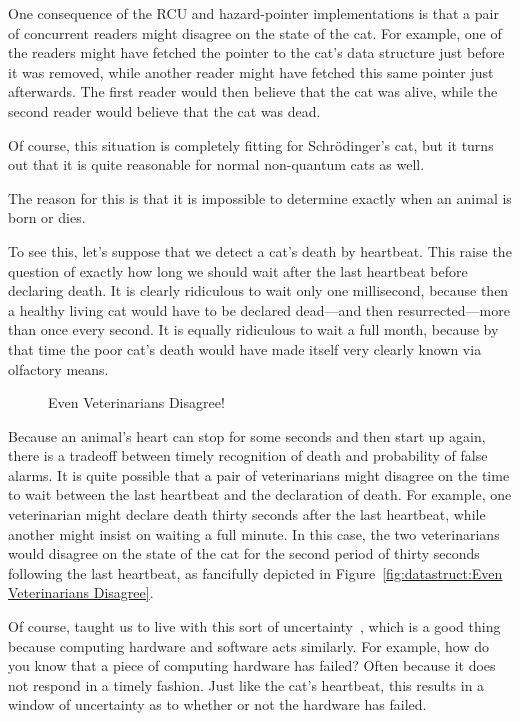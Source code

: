 One consequence of the RCU and hazard-pointer implementations is
that a pair of concurrent readers might disagree on the state of
the cat.
For example, one of the readers might have fetched the pointer to
the cat's data structure just before it was removed, while another
reader might have fetched this same pointer just afterwards.
The first reader would then believe that the cat was alive, while
the second reader would believe that the cat was dead.

Of course, this situation is completely fitting for Schr\"odinger's
cat, but it turns out that it is quite reasonable for normal
non-quantum cats as well.

The reason for this is that it is impossible to determine exactly
when an animal is born or dies.

To see this, let's suppose that we detect a cat's death by heartbeat.
This raise the question of exactly how long we should wait after the
last heartbeat before declaring death.
It is clearly ridiculous to wait only one millisecond, because then
a healthy living cat would have to be declared dead---and then
resurrected---more than once every second.
It is equally ridiculous to wait a full month, because by that time
the poor cat's death would have made itself very clearly known
via olfactory means.

\begin{figure}[tb]
\centering
{}
\caption{Even Veterinarians Disagree!}
\end{figure}

Because an animal's heart can stop for some seconds and then start up
again, there is a tradeoff between timely recognition of death and
probability of false alarms.
It is quite possible that a pair of veterinarians might disagree on
the time to wait between the last heartbeat and the declaration of
death.
For example, one veterinarian might declare death thirty seconds after
the last heartbeat, while another might insist on waiting a full
minute.
In this case, the two veterinarians would disagree on the state of the
cat for the second period of thirty seconds following the last heartbeat,
as fancifully depicted in
Figure~\ref{fig:datastruct:Even Veterinarians Disagree}.

Of course,  taught us to live with this sort of
uncertainty~\cite{WeinerHeisenberg1927Uncertain}, which is a good
thing because computing hardware and software acts similarly.
For example, how do you know that a piece of computing hardware
has failed?
Often because it does not respond in a timely fashion.
Just like the cat's heartbeat, this results in a window of
uncertainty as to whether or not the hardware has failed.

